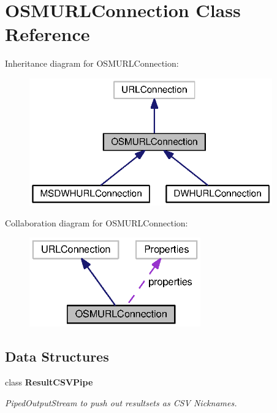 \section{O\+S\+M\+U\+R\+L\+Connection Class Reference}
\label{classorg_1_1smallfoot_1_1parser_1_1osmsql_1_1OSMURLConnection}


Inheritance diagram for O\+S\+M\+U\+R\+L\+Connection\+:\nopagebreak
\begin{figure}[H]
\begin{center}
\leavevmode
\includegraphics[width=297pt]{classorg_1_1smallfoot_1_1parser_1_1osmsql_1_1OSMURLConnection__inherit__graph}
\end{center}
\end{figure}


Collaboration diagram for O\+S\+M\+U\+R\+L\+Connection\+:
\nopagebreak
\begin{figure}[H]
\begin{center}
\leavevmode
\includegraphics[width=209pt]{classorg_1_1smallfoot_1_1parser_1_1osmsql_1_1OSMURLConnection__coll__graph}
\end{center}
\end{figure}
\subsection*{Data Structures}
\begin{DoxyCompactItemize}
\item 
class {\bf Result\+C\+S\+V\+Pipe}
\begin{DoxyCompactList}\small\item\em Piped\+Output\+Stream to push out resultsets as C\+S\+V Nicknames. \end{DoxyCompactList}\end{DoxyCompactItemize}
